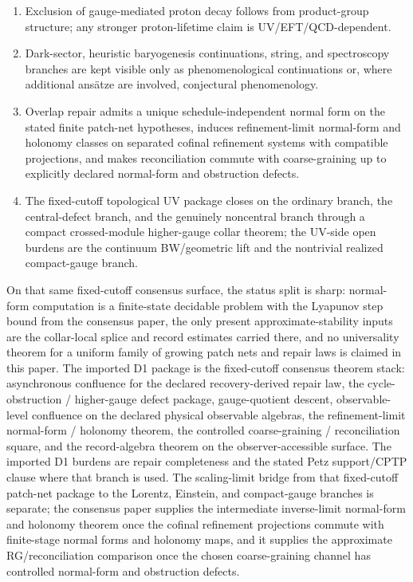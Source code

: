 \documentclass[11pt]{article}
\begin{document}
\begin{enumerate}[leftmargin=2em]
\item Exclusion of gauge-mediated proton decay follows from product-group structure; any stronger proton-lifetime claim is UV/EFT/QCD-dependent.
\item Dark-sector, heuristic baryogenesis continuations, string, and spectroscopy branches are kept visible only as phenomenological continuations or, where additional ans\"atze are involved, conjectural phenomenology.
\item Overlap repair admits a unique schedule-independent normal form on the stated finite patch-net hypotheses, induces refinement-limit normal-form and holonomy classes on separated cofinal refinement systems with compatible projections, and makes reconciliation commute with coarse-graining up to explicitly declared normal-form and obstruction defects.
\item The fixed-cutoff topological UV package closes on the ordinary branch, the central-defect branch, and the genuinely noncentral branch through a compact crossed-module higher-gauge collar theorem; the UV-side open burdens are the continuum BW/geometric lift and the nontrivial realized compact-gauge branch.
\end{enumerate}

On that same fixed-cutoff consensus surface, the status split is sharp: normal-form computation is
a finite-state decidable problem with the Lyapunov step bound from the consensus paper, the only
present approximate-stability inputs are the collar-local splice and record estimates carried
there, and no universality theorem for a uniform family of growing patch nets and repair laws is
claimed in this paper.
The imported D1 package is the fixed-cutoff consensus theorem stack: asynchronous confluence
for the declared recovery-derived repair law, the cycle-obstruction / higher-gauge defect package,
gauge-quotient descent, observable-level confluence on the declared physical observable algebras,
the refinement-limit normal-form / holonomy theorem, the controlled coarse-graining /
reconciliation square, and the record-algebra theorem on the observer-accessible surface. The imported D1
burdens are repair completeness and the stated Petz support/CPTP clause where that branch is used.
The scaling-limit bridge from that fixed-cutoff patch-net package to the Lorentz, Einstein, and
compact-gauge branches is separate; the consensus paper supplies the intermediate inverse-limit
normal-form and holonomy theorem once the cofinal refinement projections commute with finite-stage
normal forms and holonomy maps, and it supplies the approximate RG/reconciliation comparison once
the chosen coarse-graining channel has controlled normal-form and obstruction defects.
\end{document}
